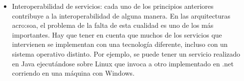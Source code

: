 \begin{itemize}
  \item Interoperabilidad de servicios: cada uno de los principios anteriores contribuye a la interoperabilidad de alguna manera. En las arquitecturas \gls{acro:soa}, el problema de la falta de esta cualidad es uno de los más importantes. Hay que tener en cuenta que muchos de los servicios que intervienen se implementan con una tecnología diferente, incluso con un sistema operativo distinto. Por ejemplo, se puede tener un servicio realizado en Java ejecutándose sobre Linux que invoca a otro implementado en .net corriendo en una máquina con Windows.
\end{itemize}
